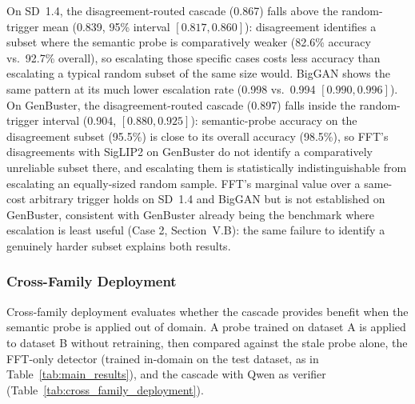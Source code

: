 \documentclass{ieeeaccess}
\begin{document}
On SD~1.4, the disagreement-routed cascade (0.867) falls above the random-trigger
mean (0.839, 95\% interval $[0.817, 0.860]$): disagreement identifies a subset where
the semantic probe is comparatively weaker (82.6\% accuracy vs.\ 92.7\% overall), so
escalating those specific cases costs less accuracy than escalating a typical random
subset of the same size would. BigGAN shows the same pattern at its much lower
escalation rate (0.998 vs.\ 0.994 $[0.990, 0.996]$). On GenBuster, the disagreement-routed
cascade (0.897) falls inside the random-trigger interval (0.904, $[0.880, 0.925]$):
semantic-probe accuracy on the disagreement subset (95.5\%) is close to its overall
accuracy (98.5\%), so FFT's disagreements with SigLIP2 on GenBuster do not identify a
comparatively unreliable subset there, and escalating them is statistically
indistinguishable from escalating an equally-sized random sample. FFT's marginal value
over a same-cost arbitrary trigger holds on SD~1.4 and BigGAN but is not established on
GenBuster, consistent with GenBuster already being the benchmark where escalation is
least useful (Case 2, Section~V.B): the same failure to identify a genuinely harder
subset explains both results.

\subsubsection{Cross-Family Deployment}
\label{sec:cross_family_deployment}

Cross-family deployment evaluates whether the cascade provides benefit when the semantic
probe is applied out of domain. A probe trained on dataset A is applied to dataset B
without retraining, then compared against the stale probe alone, the FFT-only detector
(trained in-domain on the test dataset, as in Table~\ref{tab:main_results}),
and the cascade with Qwen as verifier (Table~\ref{tab:cross_family_deployment}).
\end{document}

